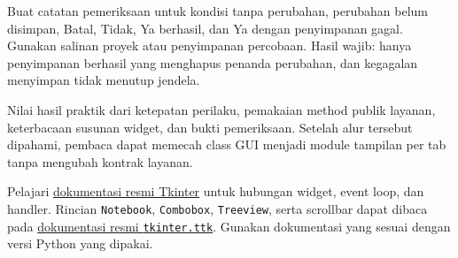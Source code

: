 Buat catatan pemeriksaan untuk kondisi tanpa perubahan, perubahan belum disimpan, Batal, Tidak, Ya berhasil, dan Ya dengan penyimpanan gagal. Gunakan salinan proyek atau penyimpanan percobaan. Hasil wajib: hanya penyimpanan berhasil yang menghapus penanda perubahan, dan kegagalan menyimpan tidak menutup jendela.

Nilai hasil praktik dari ketepatan perilaku, pemakaian method publik layanan, keterbacaan susunan widget, dan bukti pemeriksaan. Setelah alur tersebut dipahami, pembaca dapat memecah class GUI menjadi module tampilan per tab tanpa mengubah kontrak layanan.

\begin{info}
Pelajari \href{https://docs.python.org/3.12/library/tkinter.html}{dokumentasi resmi Tkinter} untuk hubungan widget, event loop, dan handler. Rincian \texttt{Notebook}, \texttt{Combobox}, \texttt{Treeview}, serta scrollbar dapat dibaca pada \href{https://docs.python.org/3.12/library/tkinter.ttk.html}{dokumentasi resmi \texttt{tkinter.ttk}}. Gunakan dokumentasi yang sesuai dengan versi Python yang dipakai.
\end{info}
\endgroup
